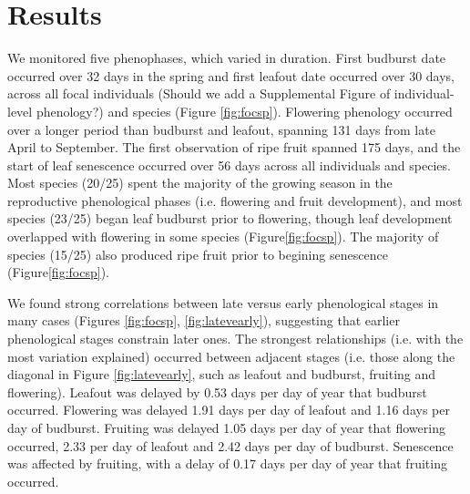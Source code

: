 \documentclass{article}
\begin{document}
\section* {Results}
\par We monitored five phenophases, which varied in duration. First budburst date occurred over 32 days in the spring and first leafout date occurred over 30 days, across all focal individuals (Should we add a Supplemental Figure of individual-level phenology?) and species (Figure \ref{fig:focsp}). Flowering phenology occurred over a longer period than budburst and leafout, spanning 131 days from late April to September. The first observation of ripe fruit spanned 175 days, and the start of leaf senescence occurred over 56 days across all individuals and species. 
Most species (20/25) spent the majority of the growing season in the reproductive phenological phases (i.e. flowering and fruit development), and most species (23/25) began leaf budburst prior to flowering, though leaf development overlapped with flowering in some species (Figure\ref{fig:focsp}). The majority of species (15/25) also produced ripe fruit prior to begining senescence (Figure\ref{fig:focsp}).
\par We found strong correlations between late versus early phenological stages in many cases (Figures \ref{fig:focsp}, \ref{fig:latevearly}), suggesting that earlier phenological stages constrain later ones. The strongest relationships (i.e. with the most variation explained) occurred between adjacent stages (i.e. those along the diagonal in Figure \ref{fig:latevearly}, such as leafout and budburst, fruiting and flowering). 
Leafout was delayed by 0.53 days per day of year that budburst occurred. Flowering was delayed 1.91 days per day of leafout and 1.16 days per day of budburst. Fruiting was delayed 1.05 days per day of year that flowering occurred, 2.33 per day of leafout and 2.42 days per day of budburst. Senescence was affected by fruiting, with a delay of 0.17 days per day of year that fruiting occurred.%
\end{document}
